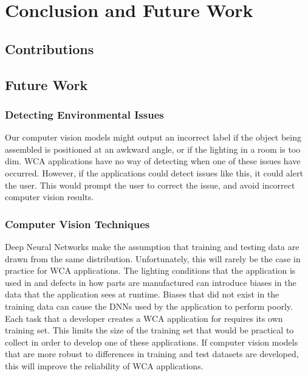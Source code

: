 \chapter{Conclusion and Future Work}\label{chap:conclusion}

\section{Contributions}

\section{Future Work}

\subsection{Detecting Environmental Issues}

Our computer vision models might output an incorrect label if the object being
assembled is positioned at an awkward angle, or if the lighting in a room is
too dim.
WCA applications have no way of detecting when one of these issues have
occurred.
However, if the applications could detect issues like this, it could alert the
user.
This would prompt the user to correct the issue, and avoid incorrect computer
vision results.

\subsection{Computer Vision Techniques}

Deep Neural Networks make the assumption that training and testing data are
drawn from the same distribution.
Unfortunately, this will rarely be the case in practice for WCA applications.
The lighting conditions that the application is used in and defects in how parts
are manufactured can introduce biases in the data that the application sees at
runtime.
Biases that did not exist in the training data can cause the DNNs used by the
application to perform poorly.
Each task that a developer creates a WCA application for requires its own
training set.
This limits the size of the training set that would be practical to collect in
order to develop one of these applications.
If computer vision models that are more robust to differences in training and
test datasets are developed, this will improve the reliability of WCA
applications.
